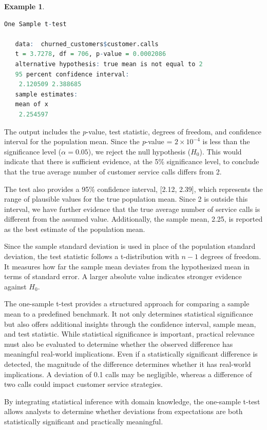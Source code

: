 \documentclass[
  11pt,
]{book}
\theoremstyle{definition}
\theoremstyle{definition}
\newtheorem{example}{Example}[chapter]
\theoremstyle{definition}
\theoremstyle{definition}
\theoremstyle{remark}
\begin{document}
\begin{example}
\begin{lstlisting}[language=R]
    One Sample t-test
   
   data:  churned_customers$customer.calls
   t = 3.7278, df = 706, p-value = 0.0002086
   alternative hypothesis: true mean is not equal to 2
   95 percent confidence interval:
    2.120509 2.388685
   sample estimates:
   mean of x 
    2.254597
\end{lstlisting}

The output includes the \emph{p}-value, test statistic, degrees of freedom, and confidence interval for the population mean. Since the \emph{p}-value = \ensuremath{2\times 10^{-4}} is less than the significance level (\(\alpha = 0.05\)), we reject the null hypothesis (\(H_0\)). This would indicate that there is sufficient evidence, at the 5\% significance level, to conclude that the true average number of customer service calls differs from 2.

The test also provides a 95\% confidence interval, {[}2.12, 2.39{]}, which represents the range of plausible values for the true population mean. Since 2 is outside this interval, we have further evidence that the true average number of service calls is different from the assumed value. Additionally, the sample mean, 2.25, is reported as the best estimate of the population mean.

Since the sample standard deviation is used in place of the population standard deviation, the test statistic follows a t-distribution with \(n - 1\) degrees of freedom. It measures how far the sample mean deviates from the hypothesized mean in terms of standard error. A larger absolute value indicates stronger evidence against \(H_0\).
\end{example}

The one-sample t-test provides a structured approach for comparing a sample mean to a predefined benchmark. It not only determines statistical significance but also offers additional insights through the confidence interval, sample mean, and test statistic. While statistical significance is important, practical relevance must also be evaluated to determine whether the observed difference has meaningful real-world implications. Even if a statistically significant difference is detected, the magnitude of the difference determines whether it has real-world implications. A deviation of 0.1 calls may be negligible, whereas a difference of two calls could impact customer service strategies.

By integrating statistical inference with domain knowledge, the one-sample t-test allows analysts to determine whether deviations from expectations are both statistically significant and practically meaningful.
\end{document}
